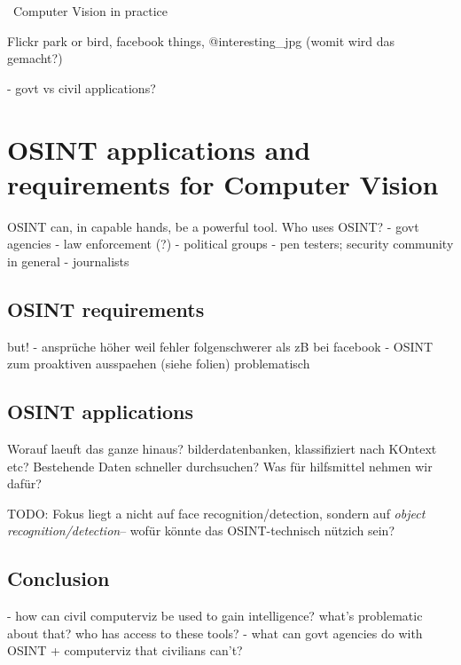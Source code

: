 \documentclass[twoside,a4paper]{article}
\begin{document}
\ {Computer Vision in practice}
\label{sec:zusammenhang}

Flickr park or bird, facebook things, @interesting\_jpg (womit wird das gemacht?)

- govt vs civil applications?

\section{OSINT applications and requirements for Computer Vision}
\label{sec:osint_req_app}

OSINT can, in capable hands, be a powerful tool. 
Who uses OSINT?
- govt agencies
- law enforcement (?)
- political groups
- pen testers; security community in general
- journalists

\subsection{OSINT requirements}
\label{subsec:osint_req}
but!
- ansprüche höher weil fehler folgenschwerer als zB bei facebook
- OSINT zum proaktiven ausspaehen (siehe folien) problematisch

\subsection{OSINT applications}
\label{subsec:osint_app}

Worauf laeuft das ganze hinaus? bilderdatenbanken, klassifiziert nach KOntext etc? Bestehende Daten schneller durchsuchen? Was für hilfsmittel nehmen wir dafür?

TODO: Fokus liegt a nicht auf face recognition/detection, sondern auf \emph{object recognition/detection}-- wofür könnte das OSINT-technisch nützich sein?


\subsection{Conclusion}
\label{subsec:conclusion}
- how can civil computerviz be used to gain intelligence? what's problematic about that? who has access to these tools?
- what can govt agencies do with OSINT + computerviz that civilians can't?


\newpage
\printglossary

\nocite{*}

\end{document}
